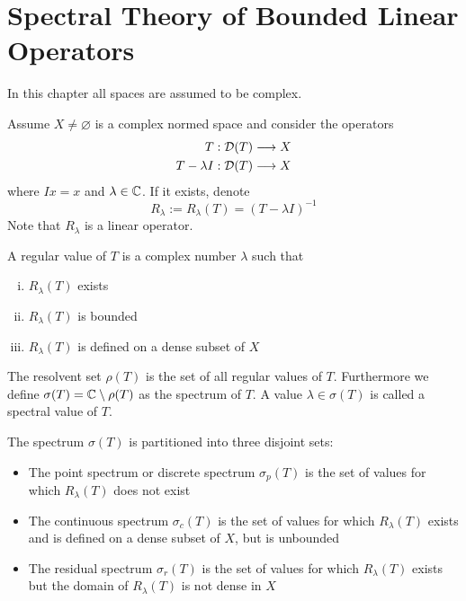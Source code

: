 \documentclass[../../script.tex]{subfiles}
\begin{document}
\section{Spectral Theory of Bounded Linear Operators}

In this chapter all spaces are assumed to be complex.

\begin{defi}
    Assume $X \ne \varnothing$ is a complex normed space and consider the operators 
    \begin{align*}
        T: \mathcal{D}(T) &\longrightarrow X \\
        T - \lambda I: \mathcal{D}(T) &\longrightarrow X
    \end{align*}
    where $Ix = x$ and $\lambda \in \mathbb{C}$. If it exists, denote 
    \[
        R_{\lambda} := R_{\lambda}(T) = (T - \lambda I)^{-1}
    \]
    Note that $R_{\lambda}$ is a linear operator.
\end{defi}

\begin{defi}
    A regular value of $T$ is a complex number $\lambda$ such that 
    \begin{enumerate}[(i)]
        \item $R_{\lambda}(T)$ exists 
        \item $R_{\lambda}(T)$ is bounded
        \item $R_{\lambda}(T)$ is defined on a dense subset of $X$
    \end{enumerate}
    The resolvent set $\rho(T)$ is the set of all regular values of $T$. Furthermore we define $\sigma(T) = \mathbb{C} \setminus \rho(T)$ as the spectrum of $T$.
    A value $\lambda \in \sigma(T)$ is called a spectral value of $T$.
\end{defi}

\begin{defi}
    The spectrum $\sigma(T)$ is partitioned into three disjoint sets:
    \begin{itemize}
        \item The point spectrum or discrete spectrum $\sigma_p(T)$ is the set of values for which $R_{\lambda}(T)$ does not exist
        \item The continuous spectrum $\sigma_c(T)$ is the set of values for which $R_{\lambda}(T)$ exists and is defined on a dense subset of $X$, but is unbounded
        \item The residual spectrum $\sigma_r(T)$ is the set of values for which $R_{\lambda}(T)$ exists but the domain of $R_{\lambda}(T)$ is not dense in $X$
    \end{itemize}
\end{defi}
\end{document}
